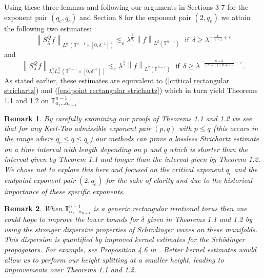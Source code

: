 \documentclass[11pt]{amsart}
\numberwithin{equation}{section}
\newcommand{\Tn}{\mathbb{T}^{n-1}}
\newcommand{\la}{\lambda}
\newcommand\norm[1]{\left\lVert#1\right\rVert}
\newcommand{\lpnorm}[3]{\norm{#1}_{L^{#2}(#3)}}
\newcommand{\mixlpnorm}[4]{\norm{#1}_{L^{#2}_{t} L^{#3}_{x}(#4)}}
\newcommand{\Sl}{S_{\la}}
\newtheorem{remark}{Remark}[section]
\begin{document}
Using these three lemmas and following our arguments in Sections 3-7 for the exponent pair $(q_c, q_c)$ and Section 8 for the exponent pair $(2,q_e)$ we attain the following two estimates:
\begin{equation}
    \lpnorm{\Sl^{Q}f}{q_c}{\Tn \times [0,\delta^{-1}]} \lesssim_{\varepsilon} \la^{\frac{1}{q_c}} \lpnorm{f}{2}{\Tn} \ \ \ \text{if} \ \ \delta \geq \la^{-\frac{1}{n+1} + \varepsilon}
\end{equation}
and 
\begin{equation}
    \mixlpnorm{\Sl^{Q}f}{2}{q_e}{\Tn \times [0,\delta^{-1}]} \lesssim_{\varepsilon} \la^{\frac{1}{2}} \lpnorm{f}{2}{\Tn} \ \ \ \text{if} \ \ \delta \geq \la^{-\frac{n-3}{(n-1)(n+3)} + \varepsilon}.
\end{equation}
As stated earlier, these estimates are equivalent to (\ref{critical rectangular strichartz}) and (\ref{endpoint rectangular strichartz}) which in turn yield Theorems 1.1 and 1.2 on $\Tn_{\alpha_1...\alpha_{n-1}}$.



\begin{remark}
    By carefully examining our proofs of Theorems 1.1 and 1.2 we see that for any Keel-Tao admissible exponent pair $(p,q)$ with $p \leq q$ (this occurs in the range where $q_c \leq q \leq q_e$) our methods can prove a lossless Strichartz estimate on a time interval with length depending on $p$ and $q$ which is shorter than the interval given by Theorem 1.1 and longer than the interval given by Theorem 1.2. We chose not to explore this here and focused on the critical exponent $q_c$ and the endpoint exponent pair $(2,q_e)$ for the sake of clarity and due to the historical importance of these specific exponents.
\end{remark}

\begin{remark}
    When $\Tn_{\alpha_1...\alpha_{n-1}}$ is a generic rectangular irrational torus then one could hope to improve the lower bounds for $\delta$ given in Theorems 1.1 and 1.2 by using the stronger dispersive properties of Schr\"{o}dinger waves on these manifolds. This dispersion is quantified by improved kernel estimates for the Sch\"{o}dinger propagators. For example, see Proposition 4.6 in \cite{Deng2017Strichartz}. Better kernel estimates would allow us to perform our height splitting at a smaller height, leading to improvements over Theorems 1.1 and 1.2.
\end{remark}
\end{document}
